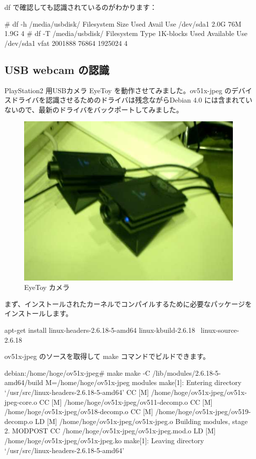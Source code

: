 \documentclass[mingoth,a4paper]{jsarticle}
\begin{document}
df で確認しても認識されているのがわかります：

\begin{commandline}
# df -h /media/usbdisk/
Filesystem            Size  Used Avail Use%
/dev/sda1             2.0G   76M  1.9G   4%
# df -T /media/usbdisk/
Filesystem    Type   1K-blocks      Used Available Use%
/dev/sda1     vfat     2001888     76864   1925024   4%
\end{commandline}

\subsection{USB webcam の認識}

PlayStation2 用USBカメラ EyeToy を動作させてみました。ov51x-jpeg のデバイ
スドライバを認識させるためのドライバは残念ながらDebian 4.0 には含まれてい
ないので、最新のドライバをバックポートしてみました。

\begin{figure}[H]
\begin{center}
  \includegraphics[width=0.5\hsize]{image200710/eyetoy.jpg}
\end{center}
\caption{EyeToy カメラ}
\label{eyetoy}
\end{figure}


まず、インストールされたカーネルでコンパイルするために必要なパッケージを
インストールします。

\begin{commandline}
apt-get install linux-headers-2.6.18-5-amd64 linux-kbuild-2.6.18 \
 linux-source-2.6.18
\end{commandline}

ov51x-jpeg のソースを取得して make コマンドでビルドできます。

\begin{commandline}
debian:/home/hoge/ov51x-jpeg# make 
make -C /lib/modules/2.6.18-5-amd64/build M=/home/hoge/ov51x-jpeg modules
make[1]: Entering directory `/usr/src/linux-headers-2.6.18-5-amd64'
  CC [M]  /home/hoge/ov51x-jpeg/ov51x-jpeg-core.o
  CC [M]  /home/hoge/ov51x-jpeg/ov511-decomp.o
  CC [M]  /home/hoge/ov51x-jpeg/ov518-decomp.o
  CC [M]  /home/hoge/ov51x-jpeg/ov519-decomp.o
  LD [M]  /home/hoge/ov51x-jpeg/ov51x-jpeg.o
  Building modules, stage 2.
  MODPOST
  CC      /home/hoge/ov51x-jpeg/ov51x-jpeg.mod.o
  LD [M]  /home/hoge/ov51x-jpeg/ov51x-jpeg.ko
make[1]: Leaving directory `/usr/src/linux-headers-2.6.18-5-amd64'
 
\end{commandline}
\end{document}
